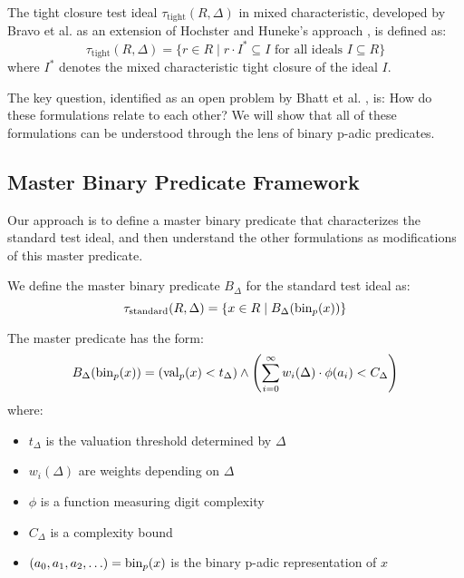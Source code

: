 \begin{definition}\label{def:tight-closure-test-ideal-mixed}
The tight closure test ideal $\tau_{\text{tight}}(R,\Delta)$ in mixed characteristic, developed by Bravo et al. \cite{BMP+23} as an extension of Hochster and Huneke's approach \cite{HH90}, is defined as:
$$\tau_{\text{tight}}(R,\Delta) = \{r \in R \mid r \cdot I^{*} \subseteq I \text{ for all ideals } I \subseteq R\}$$
where $I^{*}$ denotes the mixed characteristic tight closure of the ideal $I$.
\end{definition}

The key question, identified as an open problem by Bhatt et al. \cite{BMPSTWW20}, is: How do these formulations relate to each other? We will show that all of these formulations can be understood through the lens of binary p-adic predicates.

\subsection{Master Binary Predicate Framework}

Our approach is to define a master binary predicate that characterizes the standard test ideal, and then understand the other formulations as modifications of this master predicate.

\begin{definition}\label{def:master-binary-predicate}
We define the master binary predicate $B_\Delta$ for the standard test ideal as:
$$\tau_{\text{standard}}(R,\Delta) = \{x \in R \mid B_\Delta(\operatorname{bin}_p(x))\}$$

The master predicate has the form:
$$B_\Delta(\operatorname{bin}_p(x)) = \left(\operatorname{val}_p(x) < t_\Delta\right) \wedge \left(\sum_{i=0}^{\infty} w_i(\Delta) \cdot \phi(a_i) < C_\Delta\right)$$
where:
\begin{itemize}
    \item $t_\Delta$ is the valuation threshold determined by $\Delta$
    \item $w_i(\Delta)$ are weights depending on $\Delta$
    \item $\phi$ is a function measuring digit complexity
    \item $C_\Delta$ is a complexity bound
    \item $(a_0, a_1, a_2, \ldots) = \operatorname{bin}_p(x)$ is the binary p-adic representation of $x$
\end{itemize}
\end{definition}

